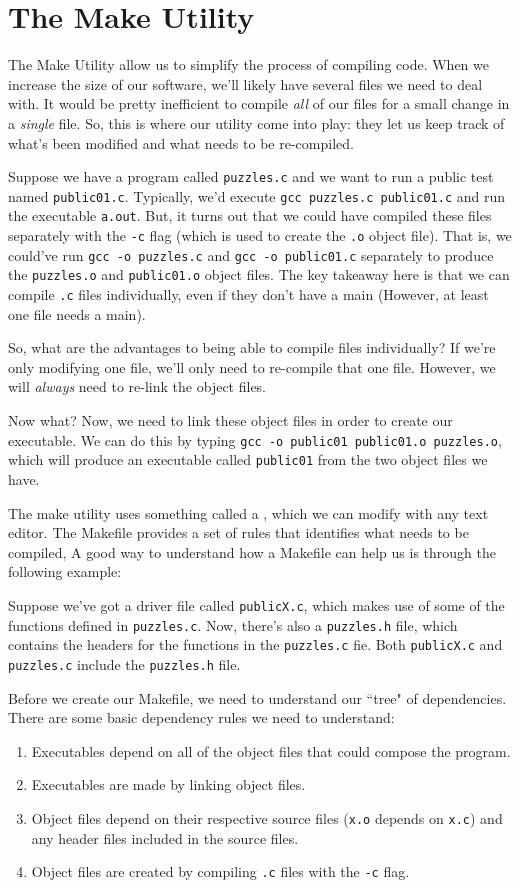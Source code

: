 \section{The Make Utility}
The Make Utility allow us to simplify the process of compiling code. When we increase the size of our software, we'll likely have several files we need to deal with. It would be pretty inefficient to compile \textit{all} of our files for a small change in a \textit{single} file.  So, this is where our utility come into play: they let us keep track of what's been modified and what needs to be re-compiled.

Suppose we have a program called \verb!puzzles.c! and we want to run a public test named \verb!public01.c!. Typically, we'd execute \verb!gcc puzzles.c public01.c! and run the executable \verb!a.out!. But, it turns out that we could have compiled these files separately with the \verb!-c! flag (which is used to create the \verb!.o! object file). That is, we could've run \verb!gcc -o puzzles.c! and \verb!gcc -o public01.c! separately to produce the \verb!puzzles.o! and \verb!public01.o! object files. The key takeaway here is that we can compile \verb!.c! files individually, even if they don't have a main (However, at least one file needs a main). 

So, what are the advantages to being able to compile files individually? If we're only modifying one file, we'll only need to re-compile that one file. However, we will \textit{always} need to re-link the object files.


Now what? Now, we need to link these object files in order to create our executable. We can do this by typing \verb!gcc -o public01 public01.o puzzles.o!, which will produce an executable called \verb!public01! from the two object files we have. 


The make utility uses something called a , which we can modify with any text editor. The Makefile provides a set of rules that identifies what needs to be compiled, A good way to understand how a Makefile can help us is through the following example:


Suppose we've got a driver file called \verb!publicX.c!, which makes use of some of the functions defined in \verb!puzzles.c!. Now, there's also a \verb!puzzles.h! file, which contains the headers for the functions in the \verb!puzzles.c! fie. Both \verb!publicX.c! and \verb!puzzles.c! include the \verb!puzzles.h! file. 

Before we create our Makefile, we need to understand our ``tree" of dependencies. There are some basic dependency rules we need to understand: \begin{enumerate}
    \item Executables depend on all of the object files that could compose the program.
    \item Executables are made by linking object files.
    \item Object files depend on their respective source files (\verb!x.o! depends on \verb!x.c!) and any header files included in the source files.
    \item Object files are created by compiling \verb!.c! files with the \verb!-c! flag. 
\end{enumerate}


